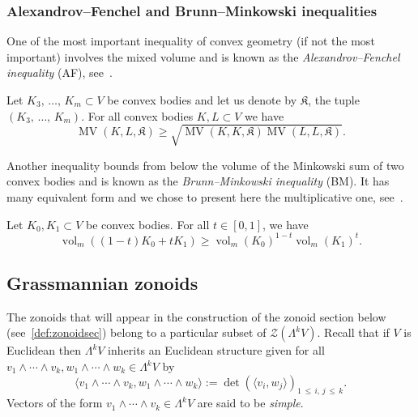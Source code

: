 \documentclass[AHL, Unicode, longabstracts, published]{cedram}
\newcommand{\fkK}{\mathfrak{K}}
\newcommand{\ZZ}{\mathscr{Z}}
\DeclareMathOperator{\vol}{vol}
\DeclareMathOperator{\MV}{MV}
\begin{document}
\subsubsection{Alexandrov--Fenchel and Brunn--Minkowski inequalities} 

One of the most important inequality of convex geometry (if not the most important) involves the mixed volume and is known as the \emph{Alexandrov--Fenchel inequality} (AF), see~\cite[Theorem~7.3.1]{bible}.
\begin{prop}[AF]\label{prop:AFi}
Let $K_3,\,\ldots,\,K_m\subset V$ be convex bodies and let us denote by $\fkK$, the tuple $(K_3,\,\ldots,\,K_m)$. For all convex bodies $K,L\subset V$ we have
\begin{equation*}
\MV(K,L,\fkK)\geq \sqrt{\MV(K,K,\fkK)\MV(L,L,\fkK)}.
\end{equation*}
\end{prop}

Another inequality bounds from below the volume of the Minkowski sum of two convex bodies and is known as the \emph{Brunn--Minkowski inequality} (BM). It has many equivalent form and we chose to present here the multiplicative one, see~\cite[p.~372~(e)]{bible}.

\begin{prop}[BM]\label{prop:BMi}
Let $K_0,K_1\subset V$ be convex bodies. For all $t\in[0,1]$, we have
\begin{equation*}
\vol_m((1-t)K_0+tK_1)\geq \vol_m(K_0)^{1-t}\vol_m(K_1)^t.
\end{equation*}
\end{prop}

\subsection{Grassmannian zonoids}\label{sec:grasszon}


The zonoids that will appear in the construction of the zonoid section below (see~\cref{def:zonoidsec}) belong to a particular subset of $\ZZ(\Lambda^k V)$. Recall that if $V$ is Euclidean then $\Lambda^k V$ inherits an Euclidean structure given for all $v_1\wedge\cdots\wedge v_k, w_1\wedge\cdots\wedge w_k\in\Lambda^k V$ by
\begin{equation*}
\langle v_1\wedge\cdots\wedge v_k, w_1\wedge\cdots\wedge w_k\rangle:=\det\left(\langle v_i, w_j\rangle\right)_{1\,\leq\,i,\,j\,\leq\,k}.
\end{equation*}
Vectors of the form $v_1\wedge\cdots\wedge v_k\in\Lambda^k V$ are said to be \emph{simple}.
\end{document}
